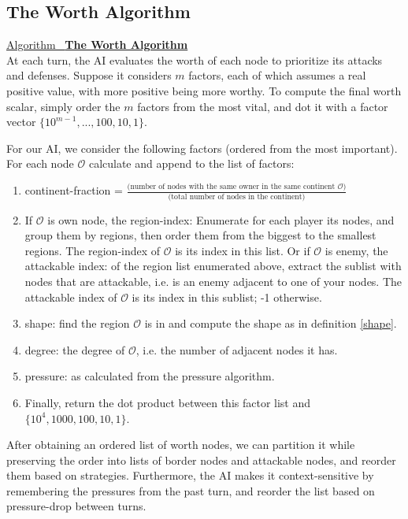 \documentclass[12pt]{article}  %
\newcommand{\algtitle}[1]{\underline{Algorithm \ {\bf #1}} \vspace*{1mm}\\}
\begin{document}
\subsection{The Worth Algorithm}

\algtitle{The Worth Algorithm}
At each turn, the AI evaluates the worth of each node to prioritize its attacks and defenses. Suppose it considers $m$ factors, each of which assumes a real positive value, with more positive being more worthy. To compute the final worth scalar, simply order the $m$ factors from the most vital, and dot it with a factor vector $\{10^{m-1}, ..., 100, 10, 1\}$.

For our AI, we consider the following factors (ordered from the most important). For each node $\mathcal{O}$ calculate and append to the list of factors:

\begin{enumerate}
	\item continent-fraction = $\frac{\text{(number of nodes with the same owner in the same continent $\mathcal{O}$)}}{\text{(total number of nodes in the continent)}}$
	\item If $\mathcal{O}$ is own node, the region-index: Enumerate for each player its nodes, and group them by regions, then order them from the biggest to the smallest regions. The region-index of $\mathcal{O}$ is its index in this list. Or if $\mathcal{O}$ is enemy, the attackable index: of the region list enumerated above, extract the sublist with nodes that are attackable, i.e. is an enemy adjacent to one of your nodes. The attackable index of $\mathcal{O}$ is its index in this sublist; -1 otherwise.
	\item shape: find the region $\mathcal{O}$ is in and compute the shape as in definition \ref{shape}.
	\item degree: the degree of $\mathcal{O}$, i.e. the number of adjacent nodes it has.
	\item pressure: as calculated from the pressure algorithm.
	\item Finally, return the dot product between this factor list and $\{10^{4}, 1000, 100, 10, 1\}$.
\end{enumerate}


After obtaining an ordered list of worth nodes, we can partition it while preserving the order into lists of border nodes and attackable nodes, and reorder them based on strategies. Furthermore, the AI makes it context-sensitive by remembering the pressures from the past turn, and reorder the list based on pressure-drop between turns.
\end{document}
